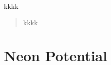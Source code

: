 \documentclass[]{article}
\title{}
\author{}
\begin{document}
\maketitle
kkkk
\begin{abstract}
kkkk
\end{abstract}

\section{Neon Potential}
\end{document}

